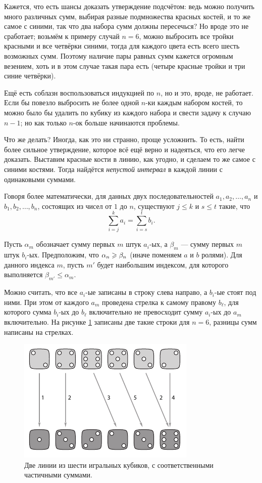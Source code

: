 Кажется, что есть шансы доказать утверждение подсчётом: ведь можно получить много различных сумм, выбирая разные подмножества красных костей, и то же самое с синими, так что два набора сумм должны пересечься?
Но вроде это не сработает;
возьмём к примеру случай $n = 6$,  можно выбросить все тройки красными и все четвёрки синими, тогда для каждого цвета есть всего шесть возможных сумм.
Поэтому наличие пары равных сумм кажется огромным везением,
хоть и в этом случае такая пара есть (четыре красные тройки и три синие четвёрки).

Ещё есть соблазн воспользоваться индукцией по $n$, но и это, вроде, не работает.
Если бы повезло выбросить не более одной $n$-ки каждым набором костей,
то можно было бы удалить по кубику из каждого набора и свести задачу к случаю $n-1$;
но как только $n$-ок больше начинаются проблемы.

Что же делать?
Иногда, как это ни странно, проще усложнить.
То есть, найти более сильное утверждение, которое всё ещё верно и надеяться, что его легче доказать.
Выставим красные кости в линию, как угодно, и сделаем то же самое с синими костями.
Тогда найдётся \emph{непустой интервал} в каждой линии с одинаковыми суммами.

Говоря более математически, для данных двух последовательностей  $a_1,a_2,\dots,a_n$ и $b_1,b_2,\dots,b_n$, состоящих из чисел от $1$ до $n$, существуют 
$j\le k$ и 
$s\le t$ такие, что 
\[\sum_{i=j}^ka_i=\sum_{i=s}^tb_i.\]

Пусть $\alpha_m$ обозначает сумму первых $m$ штук $a_i$-ых,
а $\beta_m$ --- сумму первых $m$ штук $b_i$-ых.
Предположим, что $\alpha_n\z\ge \beta_n$ (иначе поменяем $a$ и $b$ ролями).
Для данного индекса $m$, пусть $m'$ будет наибольшим индексом, для которого выполняется $\beta_{m'}\le \alpha_m$.

Можно считать, что все $a_i$-ые записаны в строку слева направо, а $b_i$-ые стоят под ними.
При этом от каждого $a_m$ проведена стрелка к самому правому $b_\ell$, для которого сумма $b_i$-ых до $b_\ell$ включительно не превосходит сумму $a_i$-ых до $a_m$ включительно.
На рисунке \ref{pic:kubiki} записаны две такие строки для $n=6$,
разницы сумм написаны на стрелках.

\begin{figure}[ht!]
\centering
\includegraphics[scale=1]{pics/kubiki}
\caption{Две линии из шести игральных кубиков, с соответственными частичными суммами.}
\label{pic:kubiki}
\end{figure}

